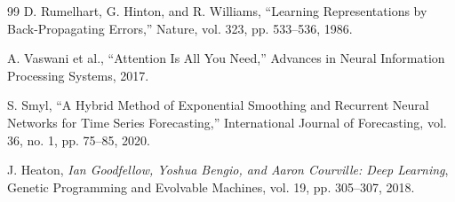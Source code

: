 \documentclass[12pt]{report}
\begin{document}
\begin{thebibliography}{99}
D. Rumelhart, G. Hinton, and R. Williams,
``Learning Representations by Back-Propagating Errors,''
Nature, vol. 323, pp. 533--536, 1986.

A. Vaswani et al.,
``Attention Is All You Need,''
Advances in Neural Information Processing Systems, 2017.

S. Smyl,
``A Hybrid Method of Exponential Smoothing and Recurrent Neural Networks for Time Series Forecasting,''
International Journal of Forecasting, vol. 36, no. 1, pp. 75--85, 2020.

J. Heaton,
\textit{Ian Goodfellow, Yoshua Bengio, and Aaron Courville: Deep Learning},
Genetic Programming and Evolvable Machines, vol. 19, pp. 305--307, 2018.

\end{thebibliography}
\end{document}
